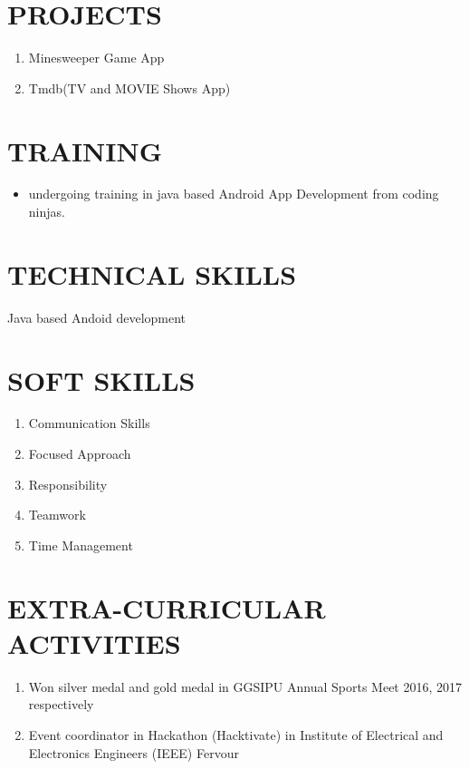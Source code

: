 \documentclass{article}
\begin{document}
\section{PROJECTS}
\Large
\begin{enumerate}
\item Minesweeper Game App
\item Tmdb(TV and MOVIE Shows App) 
\end{enumerate}

\section{TRAINING}
\begin{itemize}
\item undergoing training in java based Android App Development from coding ninjas.
\end{itemize}
\section{TECHNICAL SKILLS}
Java based Andoid development\\

\section{SOFT SKILLS}
\begin{enumerate}
\item Communication Skills\\
\item Focused Approach\\
\item Responsibility\\
\item Teamwork\\
\item  Time Management\\
\end{enumerate}

\section{EXTRA-CURRICULAR ACTIVITIES}
\begin{enumerate}
\item Won silver medal and gold medal in GGSIPU Annual Sports Meet 2016, 2017 respectively
\item Event coordinator in Hackathon (Hacktivate) in Institute of  Electrical and Electronics Engineers (IEEE) Fervour 
\end{enumerate}
\end{document}
